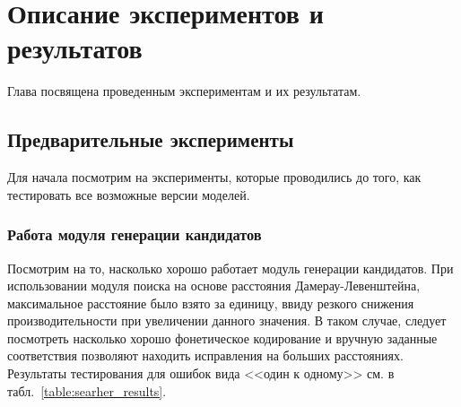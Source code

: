 \chapter{Описание экспериментов и результатов}

Глава посвящена проведенным экспериментам и их результатам.

\section{Предварительные эксперименты}

Для начала посмотрим на эксперименты, которые проводились до того, как тестировать все возможные версии моделей.

\subsection{Работа модуля генерации кандидатов}

Посмотрим на то, насколько хорошо работает модуль генерации кандидатов. При использовании модуля поиска на основе расстояния Дамерау-Левенштейна, максимальное расстояние было взято за единицу, ввиду резкого снижения производительности при увеличении данного значения. В таком случае, следует посмотреть насколько хорошо фонетическое кодирование и вручную заданные соответствия позволяют находить исправления на больших расстояниях. Результаты тестирования для ошибок вида <<один к одному>> см. в табл.~\ref{table:searher_results}.


